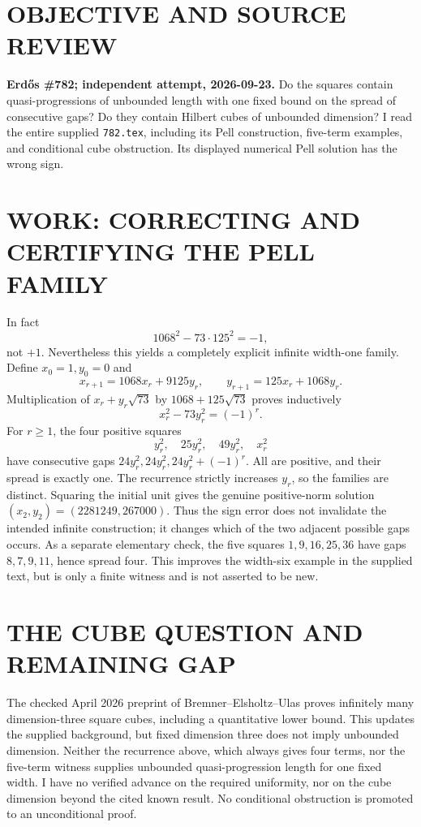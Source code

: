 \section{OBJECTIVE AND SOURCE REVIEW}
\textbf{Erd\H{o}s \#782; independent attempt, 2026-09-23.}
Do the squares contain quasi-progressions of unbounded length with one fixed bound on the spread of consecutive gaps? Do they contain Hilbert cubes of unbounded dimension? I read the entire supplied \texttt{782.tex}, including its Pell construction, five-term examples, and conditional cube obstruction. Its displayed numerical Pell solution has the wrong sign.
\section{WORK: CORRECTING AND CERTIFYING THE PELL FAMILY}
In fact
\[
1068^2-73\cdot125^2=-1,
\]
not $+1$. Nevertheless this yields a completely explicit infinite width-one family. Define $x_0=1,y_0=0$ and
\[
x_{r+1}=1068x_r+9125y_r,\qquad
y_{r+1}=125x_r+1068y_r.
\]
Multiplication of $x_r+y_r\sqrt{73}$ by $1068+125\sqrt{73}$ proves inductively
\[
x_r^2-73y_r^2=(-1)^r.
\]
For $r\ge1$, the four positive squares
\[
y_r^2,\quad25y_r^2,\quad49y_r^2,\quad x_r^2
\]
have consecutive gaps $24y_r^2,24y_r^2,24y_r^2+(-1)^r$. All are positive, and their spread is exactly one. The recurrence strictly increases $y_r$, so the families are distinct. Squaring the initial unit gives the genuine positive-norm solution $(x_2,y_2)=(2281249,267000)$. Thus the sign error does not invalidate the intended infinite construction; it changes which of the two adjacent possible gaps occurs.
As a separate elementary check, the five squares $1,9,16,25,36$ have gaps $8,7,9,11$, hence spread four. This improves the width-six example in the supplied text, but is only a finite witness and is not asserted to be new.
\section{THE CUBE QUESTION AND REMAINING GAP}
The checked April 2026 preprint of Bremner--Elsholtz--Ulas proves infinitely many dimension-three square cubes, including a quantitative lower bound. This updates the supplied background, but fixed dimension three does not imply unbounded dimension. Neither the recurrence above, which always gives four terms, nor the five-term witness supplies unbounded quasi-progression length for one fixed width. I have no verified advance on the required uniformity, nor on the cube dimension beyond the cited known result. No conditional obstruction is promoted to an unconditional proof.
